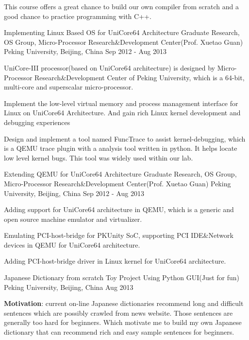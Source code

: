 \begin{cventries}
{\begin{cvitems}
        \item {This course offers a great chance to build our own compiler from scratch and a good chance to practice programming with C++.}
      \end{cvitems}
    }
  \cventry
    {Implementing Linux Based OS for UniCore64 Architecture}
    {Graduate Research, OS Group, Micro-Processor Research\&Development Center(Prof. Xuetao Guan)}
    {Peking University, Beijing, China}
    {Sep 2012 - Aug 2013}
    {
      \begin{cvitems}
        \item {UniCore-III processor(based on UniCore64 architecture) is designed by Micro-Processor Research\&Development Center of Peking University, which is a 64-bit, multi-core and superscalar micro-processor.}
        \item {Implement the low-level virtual memory and process management interface for Linux on UniCore64 Architecture. And gain rich Linux kernel development and debugging experiences}
        \item {Design and implement a tool named FuncTrace to assist kernel-debugging, which is a QEMU trace plugin with a analysis tool written in python. It helps locate low level kernel bugs. This tool was widely used within our lab.}
      \end{cvitems}
    }
    \cventry
    {Extending QEMU for UniCore64 Architecture}
    {Graduate Research, OS Group, Micro-Processor Research\&Development Center(Prof. Xuetao Guan)}
    {Peking University, Beijing, China}
    {Sep 2012 - Aug 2013}
    {
      \begin{cvitems}
        \item {Adding support for UniCore64 architecture in QEMU, which is a generic and open source machine emulator and virtualizer.}
        \item {Emulating PCI-host-bridge for PKUnity SoC, supporting PCI IDE\&Network devices in QEMU for UniCore64 architecture.}
        \item {Adding PCI-host-bridge driver in Linux kernel for UniCore64 architecture.}
      \end{cvitems}
    }
  \cventry
    {Japanese Dictionary from scratch}
    {Toy Project Using Python GUI(Just for fun)}
    {Peking University, Beijing, China}
    {Aug 2013}
    {
      \begin{cvitems}
        \item {\textbf{Motivation}: current on-line Japanese dictionaries recommend long and difficult sentences which are possibly crawled from news website. Those sentences are generally too hard for beginners. Which motivate me to build my own Japanese dictionary that can recommend rich and easy sample sentences for beginners.}

\end{cvitems}}
\end{cventries}
